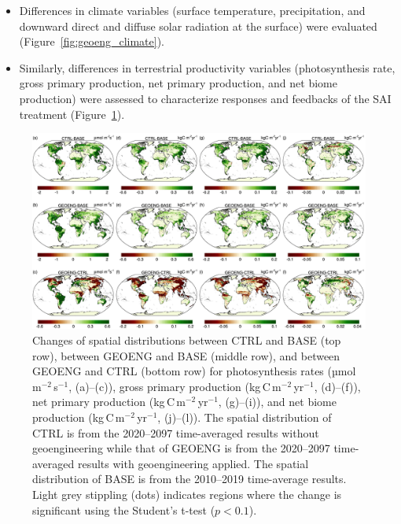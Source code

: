 \begin{itemize}
	\item Differences in climate variables (surface temperature, precipitation, and downward direct and diffuse solar radiation at the surface) were evaluated (Figure~\ref{fig:geoeng_climate}).
	\item Similarly, differences in terrestrial productivity variables (photosynthesis rate, gross primary production, net primary production, and net biome production) were assessed to characterize responses and feedbacks of the SAI treatment (Figure~\ref{fig:geoeng_bgc}).
\end{itemize}


\begin{figure}
	\begin{center}
		\includegraphics[width=\columnwidth]{erl_figures/Fig3.jpg}
	\end{center}
	\caption{Changes of spatial distributions between CTRL and BASE (top row), between GEOENG and BASE (middle row), and between GEOENG and CTRL (bottom row) for photosynthesis rates (µmol\,m$^{-2}$\,s$^{-1}$, (a)--(c)), gross primary production (kg\,C\,m$^{-2}$\,yr$^{-1}$, (d)--(f)), net primary production (kg\,C\,m$^{-2}$\,yr$^{-1}$, (g)--(i)), and net biome production (kg\,C\,m$^{-2}$\,yr$^{-1}$, (j)--(l)). The spatial distribution of CTRL is from the 2020--2097 time-averaged results without geoengineering while that of GEOENG is from the 2020--2097 time-averaged results with geoengineering applied. The spatial distribution of BASE is from the 2010--2019 time-average results. Light grey stippling (dots) indicates regions where the change is significant using the Student's t-test ($p < 0.1$).
	}\label{fig:geoeng_bgc}
\end{figure}


